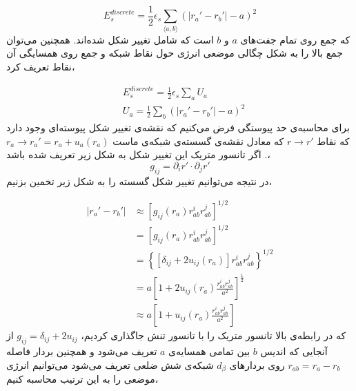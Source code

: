 \begin{equation}
E_s^{discrete}=\frac{1}{2}\epsilon_s\sum_{\langle a,b\rangle}\left(|r_a'-r_b'|-a\right)^2
\label{eq:stretchdiscrete}
\end{equation}
که جمع روی تمام جفت‌های $a$ و $b$ است که شامل تغییر شکل شده‌اند.  همچنین می‌توان جمع بالا را به شکل چگالی موضعی انرژی حول نقاط شبکه و جمع روی همسایگی‌ آن نقاط تعریف کرد،

\begin{equation}
\begin{aligned}
&E_s^{discrete}=\frac{1}{2}\epsilon_s\sum_aU_a\\
&U_a=\frac{1}{2}\sum_b\left(|r_a'-r_b'|-a\right)^2
\end{aligned}
\end{equation}
برای محاسبه‌ی حد پیوستگی فرض می‌کنیم که نقشه‌‌ی تغییر شکل پیوسته‌ای وجود دارد که نقاط 
$r\rightarrow r'$
که معادل نقشه‌ی گسسته‌ی شبکه‌ی ماست
$r_a\rightarrow r_a'=r_a+u_a(r_a)$
. اگر تانسور متریک این تغییر شکل به شکل زیر تعریف شده باشد،
\begin{equation}
g_{ij}=\partial_i r'\cdot\partial_jr'
\end{equation}
در نتیجه می‌توانیم تغییر شکل گسسته را به شکل زیر تخمین بزنیم،

\begin{equation}
\begin{aligned}
|r_a'-r_b'|&\approx \left[g_{ij}(r_a)r_{ab}^ir_{ab}^j\right]^{1/2}\\
&= \left[g_{ij}(r_a)r_{ab}^ir_{ab}^j\right]^{1/2}\\
&= \left\{\left[\delta_{ij}+2u_{ij}(r_a)\right]r_{ab}^ir_{ab}^j\right\}^{1/2}\\
&= a\left[1+2u_{ij}(r_a)\frac{r_{ab}^ir_{ab}^j}{a^2}\right]^\frac{1}{2}\\
&\approx a\left[1+u_{ij}(r_a)\frac{r_{ab}^ir_{ab}^j}{a^2}\right]
\label{eq:gstrain1}
\end{aligned}
\end{equation}
که در رابطه‌ی بالا تانسور متریک را با تانسور تنش جاگذاری کردیم،
$g_{ij}=\delta_{ij}+2u_{ij}$
از آنجایی که اندیس $b$ بین تمامی همسایه‌ی $a$ تعریف می‌شود و همچنین بردار فاصله‌
$r_{ab}=r_a-r_b$
روی بردار‌های
$d_\beta$
 شبکه‌ی شش ضلعی تعریف می‌شود می‌توانیم انرژی موضعی را به این ترتیب محاسبه‌ کنیم،

